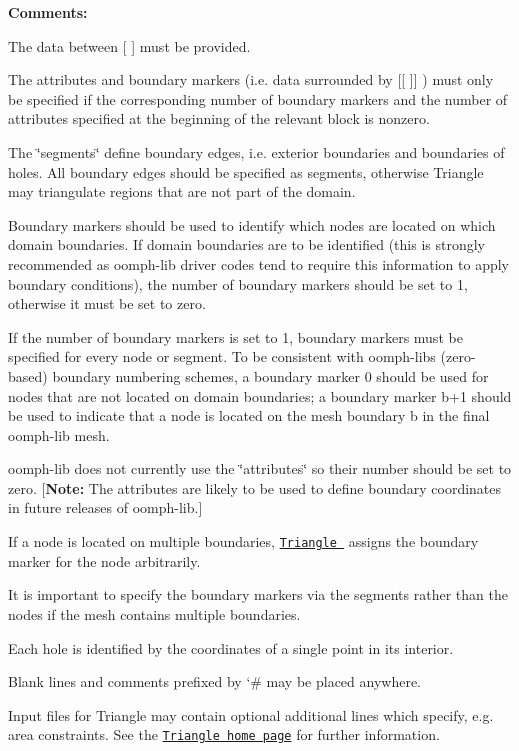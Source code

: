 {\bfseries Comments\+:} 
\begin{DoxyItemize}
\item The data between \mbox{[} \mbox{]} must be provided.
\item The attributes and boundary markers (i.\+e. data surrounded by \mbox{[}\mbox{[} \mbox{]}\mbox{]} ) must only be specified if the corresponding number of boundary markers and the number of attributes specified at the beginning of the relevant block is nonzero.
\item The \char`\"{}segments\char`\"{} define boundary edges, i.\+e. exterior boundaries and boundaries of holes. All boundary edges should be specified as segments, otherwise {\ttfamily Triangle} may triangulate regions that are not part of the domain.
\item Boundary markers should be used to identify which nodes are located on which domain boundaries. If domain boundaries are to be identified (this is strongly recommended as {\ttfamily oomph-\/lib} driver codes tend to require this information to apply boundary conditions), the number of boundary markers should be set to 1, otherwise it must be set to zero.
\item If the number of boundary markers is set to 1, boundary markers must be specified for every node or segment. To be consistent with {\ttfamily oomph-\/lib\textquotesingle{}s} (zero-\/based) boundary numbering schemes, a boundary marker 0 should be used for nodes that are not located on domain boundaries; a boundary marker {\ttfamily b+1} should be used to indicate that a node is located on the mesh boundary {\ttfamily b} in the final {\ttfamily oomph-\/lib} mesh.
\item {\ttfamily oomph-\/lib} does not currently use the \char`\"{}attributes\char`\"{} so their number should be set to zero. \mbox{[}{\bfseries Note\+:} The attributes are likely to be used to define boundary coordinates in future releases of {\ttfamily oomph-\/lib}.\mbox{]}
\item If a node is located on multiple boundaries, \href{http://www.cs.cmu.edu/~quake/triangle.html}{\tt {\ttfamily Triangle} } assigns the boundary marker for the node arbitrarily.
\item It is important to specify the boundary markers via the segments rather than the nodes if the mesh contains multiple boundaries.
\item Each hole is identified by the coordinates of a single point in its interior.
\item Blank lines and comments prefixed by `\#\textquotesingle{} may be placed anywhere.
\item Input files for {\ttfamily Triangle} may contain optional additional lines which specify, e.\+g. area constraints. See the \href{http://www.cs.cmu.edu/~quake/triangle.html}{\tt {\ttfamily Triangle} home page} for further information.
\end{DoxyItemize}


